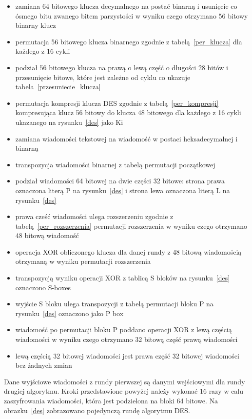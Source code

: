 \documentclass[12p]{article}
\begin{document}
\begin{itemize}
\item zamiana 64 bitowego klucza decymalnego na postać binarną i usunięcie co ósmego bitu zwanego bitem parzystości w wyniku czego otrzymano 56 bitowy binarny klucz
\item permutacja 56 bitowego klucza binarnego zgodnie z tabelą~\ref{per_klucza} dla każdego z 16 cykli
\item podział 56 bitowego klucza na prawą o lewą część o długości 28 bitów i przesunięcie bitowe, które jest zależne od cyklu co ukazuje tabela~\ref{przesuniecie_klucza}
\item permutacja kompresji klucza DES zgodnie z tabelą~\ref{per_kompresji} kompresująca klucz 56 bitowy do klucza 48 bitowego dla każdego z 16 cykli ukazanego na rysunku~\ref{des} jako  K{i}
\item zamiana wiadomości tekstowej na wiadomość w postaci heksadecymalnej i binarną
\item transpozycja wiadomości binarnej z tabelą permutacji początkowej
\item podział wiadomości 64 bitowej na dwie części 32 bitowe: strona prawa oznaczona literą P na rysunku~\ref{des} i strona lewa oznaczona literą L na rysunku~\ref{des}
\item prawa cześć wiadomości ulega rozszerzeniu zgodnie z tabelą~\ref{per_rozszerzenia} permutacji rozszerzenia w wyniku czego otrzymano 48 bitową wiadomość
\item operacja XOR obliczonego klucza dla danej rundy z 48 bitową wiadomością otrzymaną w wyniku permutacji rozszerzenia
\item transpozycją wyniku operacji XOR z tablicą S bloków na rysunku~\ref{des} oznaczono S-boxes
\item wyjście S bloku ulega transpozycji z tabelą permutacji bloku P na rysunku~\ref{des} oznaczono jako P box
\item wiadomość po permutacji bloku P poddano operacji XOR z lewą częścią wiadomości w wyniku czego otrzymano 32 bitową część prawą wiadomości
\item lewą częścią 32 bitowej wiadomości jest prawa część 32 bitowej wiadomości bez żadnych zmian
\end{itemize}
Dane wyjściowe wiadomości z rundy pierwszej są danymi wejściowymi dla rundy drugiej algorytmu. Kroki przedstawione powyżej należy wykonać 16 razy w calu zaszyfrowania wiadomości, która jest podzielona na bloki 64 bitowe. Na obrazku~\ref{des} zobrazowano pojedynczą rundę algorytmu DES.
\end{document}
